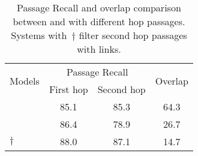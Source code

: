 
\begin{table}[t]
    \centering

    
    \footnotesize
        
    \begin{tabular}{lcc|c}
  
      \toprule
      \multirow{2}{*}{Models} & \multicolumn{2}{c|}{Passage Recall} & \multirow{2}{*}{Overlap}\\
        & First hop & Second hop & \\
       \midrule
       \grr{}   &85.1& 85.3  &64.3\\
       \name{}   & 86.4  & 78.9 & 26.7\\
       \name{}$	\dagger$   &  88.0 &  87.1 &14.7\\
      \bottomrule
    \end{tabular}
    \caption{Passage Recall and overlap comparison between \name{} and
      \grr{} with different hop passages. Systems with~$\dagger$
      filter second hop passages with links. }
        \label{tb:hops}


  \end{table}
  
